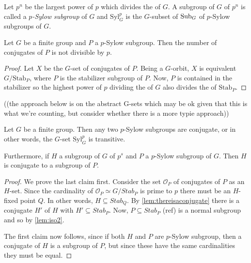 \begin{definition}
  \label{def:sylowsubgroup}
  Let $p^n$ be the largest power of $p$ which divides the \gporder of $G$.  A subgroup of $G$ of \gporder $p^n$ is called a \emph{$p$-Sylow subgroup} of $G$ and $\mathrm{Syl}_G^p$ is the $G$-subset of $\mathrm{Sub}_G$ of $p$-Sylow subgroups of $G$.
\end{definition}
\begin{lemma}
  \label{lem:numberofconjofSylow}
  Let $G$ be a finite group and $P$ a $p$-Sylow subgroup.  Then the number of conjugates of $P$ is not divisible by $p$.
\end{lemma}
\begin{proof}
  Let $X$ be the $G$-set of conjugates of $P$.  Being a $G$-orbit, $X$ is equivalent $G/\mathrm{Stab}_P$, where $P$ is the stabilizer subgroup of $P$.  Now, $P$ is contained in the stabilizer so the highest power of $p$ dividing the \gporder of $G$ also divides the \gporder of $\mathrm{Stab}_P$.
\end{proof}


  ((the approach below is on the abstract G-sets which may be ok given that this is what we're counting, but consider whether there is a more typie approach)) 
\begin{theorem}
  \label{thm:sylow2}%
  \label{lem:sylowsareconjugates}
  Let $G$ be a finite group.  Then any two $p$-Sylow subgroups are conjugate, or in other words,  the $G$-set $\mathrm{Syl}_G^p$ is transitive.
  
Furthermore, if $H$ a subgroup of $G$ of \gporder $p^s$ and $P$ a $p$-Sylow subgroup of $G$.  Then $H$ is conjugate to a subgroup of $P$.
\end{theorem}

\begin{proof}
  We prove the last claim first.
  Consider the set $\mathcal O_P$ of conjugates of $P$ as an $H$-set.  Since the cardinality of $\mathcal O_P\simeq G/Stab_P$ is prime to $p$ there must be an $H$-fixed point $Q$.  In other words, $H\subseteq Stab_Q$.  By \cref{lem:thereisaconjugate} there is a conjugate $H'$ of $H$ with $H'\subseteq Stab_P$.  Now, $P\subseteq Stab_P$ (ref) is a normal subgroup and so by \cref{lem:iso2}.

The first claim now follows, since if both $H$ and $P$ are $p$-Sylow subgroup, then a conjugate of $H$ is a subgroup of $P$, but since these have the same cardinalities they must be equal. 
\end{proof}




